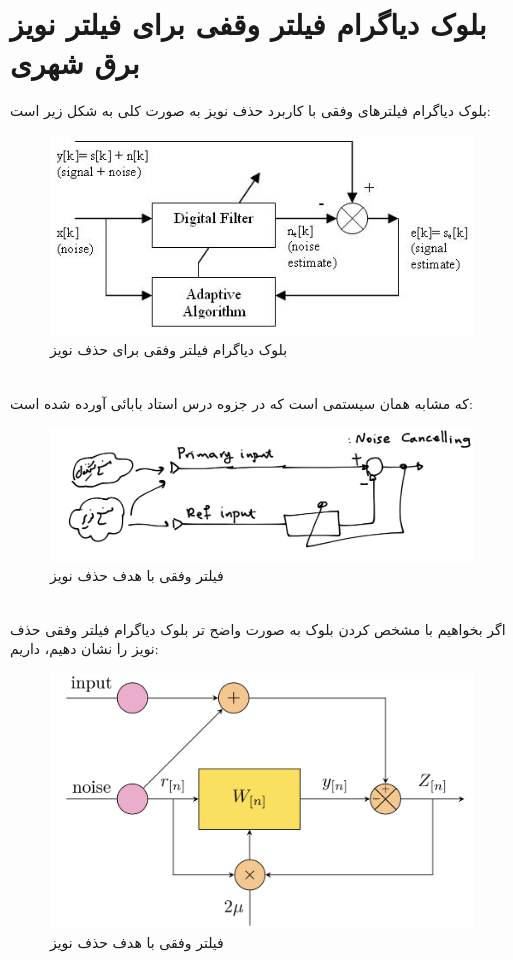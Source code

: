 \documentclass[fleqn]{article}
\theoremstyle{definition}
\begin{document}
\section{بلوک دیاگرام فیلتر وقفی برای فیلتر نویز برق شهری}
بلوک دیاگرام فیلترهای وفقی با کاربرد حذف نویز به صورت کلی به شکل  زیر است:
\begin{figure}[h!]
    \centering
    \includegraphics[width=0.6\linewidth]{./Pics/Block_diagram.png}
    \caption{بلوک دیاگرام فیلتر وفقی برای حذف نویز}
    \label{fig:BD_Adaptive Filter Noise Canseling}
\end{figure}
\\
که مشابه همان سیستمی است که در جزوه درس استاد بابائی آورده شده است:
\begin{figure}[h!]
    \centering
    \includegraphics[width=0.4\linewidth]{./Pics/Block_diagram_BABA.png}
    \caption{فیلتر وفقی با هدف حذف نویز}
    \label{fig:BD_Adaptive Filter}
\end{figure}
\\
اگر بخواهیم با مشخص کردن بلوک  به صورت واضح تر بلوک دیاگرام فیلتر وفقی حذف نویز را نشان دهیم، داریم:
\begin{figure}
    \centering
    \includegraphics[width=0.5\linewidth]{./Pics/BD.png}
    \caption{فیلتر وفقی با هدف حذف نویز}
    \label{fig:BD}
\end{figure}
\clearpage
\end{document}
